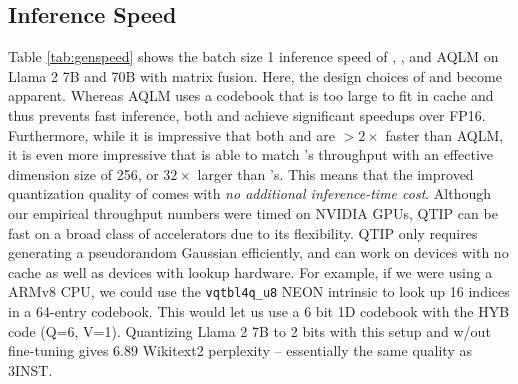 \subsection{Inference Speed}

Table \ref{tab:genspeed} shows the batch size 1 inference speed of \qt, \qs, and AQLM on Llama 2 7B and 70B with matrix fusion.
Here, the design choices of \qts and \qss become apparent.
Whereas AQLM uses a codebook that is too large to fit in cache and thus prevents fast inference, both \qts and \qss achieve significant speedups over FP16. 
Furthermore, while it is impressive that both \qss and \qts are $>2\times$ faster than AQLM, it is even more impressive that \qts is able to match \qs's throughput with an effective dimension size of 256, or $32 \times$ larger than \qs's.
This means that the improved quantization quality of \qts comes with \textit{no additional inference-time cost}.
Although our empirical throughput numbers were timed on NVIDIA GPUs, QTIP can be fast on a broad class of accelerators due to its flexibility.
QTIP only requires generating a pseudorandom Gaussian efficiently, and can work on devices with no cache as well as devices with lookup hardware. 
For example, if we were using a ARMv8 CPU, we could use the \texttt{vqtbl4q\_u8} NEON intrinsic to look up 16 indices in a 64-entry codebook. 
This would let us use a 6 bit 1D codebook with the HYB code (Q=6, V=1). 
Quantizing Llama 2 7B to 2 bits with this setup and w/out fine-tuning gives 6.89 Wikitext2 perplexity – essentially the same \sota quality as 3INST.